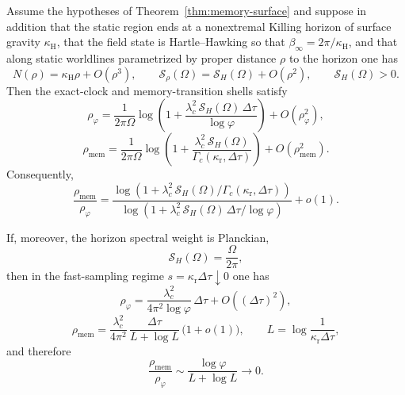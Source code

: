 \begin{theorem}\label{thm:two-shell-near-horizon}
Assume the hypotheses of Theorem~\ref{thm:memory-surface} and suppose in addition that the static region ends at a nonextremal Killing horizon of surface gravity $\kappa_{\mathrm H}$, that the field state is Hartle--Hawking so that $\beta_\infty=2\pi/\kappa_{\mathrm H}$, and that along static worldlines parametrized by proper distance $\rho$ to the horizon one has
\begin{equation}\label{eq:two-shell-horizon-data}
N(\rho)=\kappa_{\mathrm H}\rho+O(\rho^3),
\qquad
\mathcal S_\rho(\Omega)=\mathcal S_H(\Omega)+O(\rho^2),
\qquad
\mathcal S_H(\Omega)>0.
\end{equation}
Then the exact-clock and memory-transition shells satisfy
\begin{equation}\label{eq:two-shell-rho-phi}
\rho_\varphi
=
\frac{1}{2\pi\Omega}
\log\!\left(
1+\frac{\lambda_c^2\,\mathcal S_H(\Omega)\,\Delta\tau}{\log\varphi}
\right)
+O(\rho_\varphi^2),
\end{equation}
\begin{equation}\label{eq:two-shell-rho-mem}
\rho_{\mathrm{mem}}
=
\frac{1}{2\pi\Omega}
\log\!\left(
1+\frac{\lambda_c^2\,\mathcal S_H(\Omega)}{\Gamma_c(\kappa_{\mathrm r},\Delta\tau)}
\right)
+O(\rho_{\mathrm{mem}}^2).
\end{equation}
Consequently,
\begin{equation}\label{eq:two-shell-ratio}
\frac{\rho_{\mathrm{mem}}}{\rho_\varphi}
=
\frac{
\log\!\left(1+\lambda_c^2\,\mathcal S_H(\Omega)/\Gamma_c(\kappa_{\mathrm r},\Delta\tau)\right)
}{
\log\!\left(1+\lambda_c^2\,\mathcal S_H(\Omega)\,\Delta\tau/\log\varphi\right)
}
+o(1).
\end{equation}

If, moreover, the horizon spectral weight is Planckian,
\begin{equation}\label{eq:two-shell-planckian}
\mathcal S_H(\Omega)=\frac{\Omega}{2\pi},
\end{equation}
then in the fast-sampling regime $s=\kappa_{\mathrm r}\Delta\tau\downarrow 0$ one has
\begin{equation}\label{eq:two-shell-rho-phi-fast}
\rho_\varphi
=
\frac{\lambda_c^2}{4\pi^2\log\varphi}\,\Delta\tau
+O((\Delta\tau)^2),
\end{equation}
\begin{equation}\label{eq:two-shell-rho-mem-fast}
\rho_{\mathrm{mem}}
=
\frac{\lambda_c^2}{4\pi^2}\,
\frac{\Delta\tau}{L+\log L}\,
\bigl(1+o(1)\bigr),
\qquad
L=\log\frac{1}{\kappa_{\mathrm r}\Delta\tau},
\end{equation}
and therefore
\begin{equation}\label{eq:two-shell-rho-ratio-fast}
\frac{\rho_{\mathrm{mem}}}{\rho_\varphi}
\sim
\frac{\log\varphi}{L+\log L}
\longrightarrow 0.
\end{equation}


\end{theorem}
